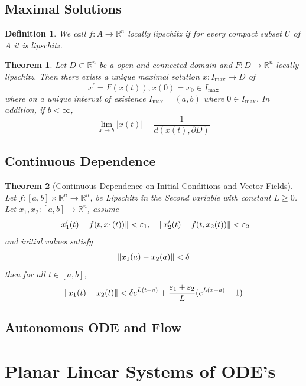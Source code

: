 \documentclass[a4paper, 12pt]{book}
\newtheorem{definition}{Definition}[chapter]
\newtheorem{theorem}{Theorem}[chapter]
\begin{document}
\section{Maximal Solutions}
\begin{definition}
	We call \( f:A\to \mathbb{R}^n \) locally lipschitz if for every compact subset \( U \) of \( A \) it is lipschitz.
\end{definition}
\begin{theorem}
	Let \( D \subset \mathbb{R}^n \) be a open and connected domain and \( F:D\to \mathbb{R}^n \) locally lipschitz. Then there exists a unique maximal solution \( x:I_{\mathrm{max}} \to D  \) of \[
		x^\prime= F(x(t)),
		x(0)=x_0\in I_{\mathrm{max}}
	\]
	where on a unique interval of existence \( I_{\mathrm{max}}=(a,b)  \) where \( 0\in I_{\mathrm{max}}  \). In addition, if \( b<\infty \), \[
		\lim_{x \to b}|x(t)|+\frac{ 1 }{ d(x(t),\partial D) }
	\]
\end{theorem}

\section{Continuous Dependence}
\begin{theorem}
	[Continuous Dependence on Initial Conditions and Vector Fields]
	Let \( f: [a,b]\times \mathbb{R}^n \to \mathbb{R}^n\), be Lipschitz in the Second variable with constant \( L\geq 0 \).\\

	Let \( x_1, x_2:[a,b]\to \mathbb{R}^n \),  assume \[
		\norm{x_1^\prime(t)-f(t,x_1(t))} <\varepsilon_1, \quad \norm{x_2^\prime(t)-f(t, x_2(t))}<\varepsilon_2
	\]
	and initial values satisfy \[
		\norm{x_1(a)-x_2(a)}< \delta
	\]
	then for all \( t\in[a,b] \),
	\[
		\norm{x_1(t)-x_2(t)} < \delta e^{L(t-a)} + \frac{ \varepsilon_1+\varepsilon_2 }{ L } (e^{L(x-a)} -1)
	\]
\end{theorem}
\section{Autonomous ODE and Flow}

\chapter{Planar Linear Systems of ODE's}
\end{document}
